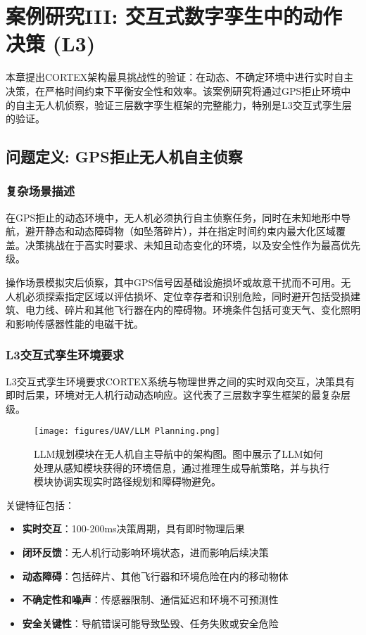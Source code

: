 
\chapter{案例研究III: 交互式数字孪生中的动作决策 (L3)} \label{chp:uav}

本章提出CORTEX架构最具挑战性的验证：在动态、不确定环境中进行实时自主决策，在严格时间约束下平衡安全性和效率。该案例研究将通过GPS拒止环境中的自主无人机侦察，验证三层数字孪生框架的完整能力，特别是L3交互式孪生层的验证。

\section{问题定义: GPS拒止无人机自主侦察}

\subsection{复杂场景描述}

在GPS拒止的动态环境中，无人机必须执行自主侦察任务，同时在未知地形中导航，避开静态和动态障碍物（如坠落碎片），并在指定时间约束内最大化区域覆盖。决策挑战在于高实时要求、未知且动态变化的环境，以及安全性作为最高优先级。

操作场景模拟灾后侦察，其中GPS信号因基础设施损坏或故意干扰而不可用。无人机必须探索指定区域以评估损坏、定位幸存者和识别危险，同时避开包括受损建筑、电力线、碎片和其他飞行器在内的障碍物。环境条件包括可变天气、变化照明和影响传感器性能的电磁干扰。

\subsection{L3交互式孪生环境要求}

L3交互式孪生环境要求CORTEX系统与物理世界之间的实时双向交互，决策具有即时后果，环境对无人机行动动态响应。这代表了三层数字孪生框架的最复杂层级。

\begin{figure}[htbp]
\centering
\texttt{[image: figures/UAV/LLM Planning.png]}
\caption{LLM规划模块在无人机自主导航中的架构图。图中展示了LLM如何处理从感知模块获得的环境信息，通过推理生成导航策略，并与执行模块协调实现实时路径规划和障碍物避免。}
\label{fig:llm_planning}
\end{figure}

关键特征包括：
\begin{itemize}
\item \textbf{实时交互}：100-200ms决策周期，具有即时物理后果
\item \textbf{闭环反馈}：无人机行动影响环境状态，进而影响后续决策
\item \textbf{动态障碍}：包括碎片、其他飞行器和环境危险在内的移动物体
\item \textbf{不确定性和噪声}：传感器限制、通信延迟和环境不可预测性
\item \textbf{安全关键性}：导航错误可能导致坠毁、任务失败或安全危险
\end{itemize}

